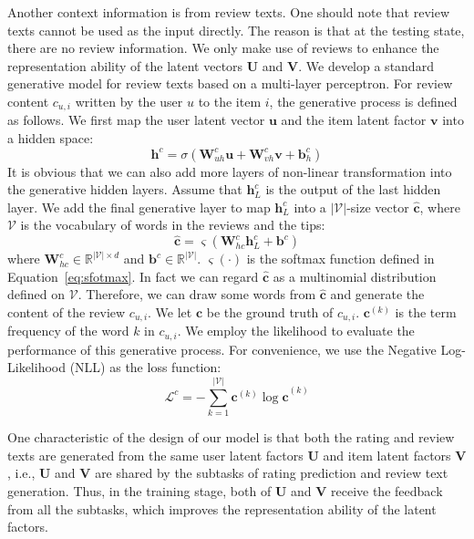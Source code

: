 \documentclass[sigconf]{acmart}
\begin{document}
Another context information is from review texts.
One should note that review texts cannot be used as the input directly.
The reason is that at the testing state, there are no review information.
We only make use of reviews to enhance the representation ability of the latent vectors $\mathbf{U}$ and  $\mathbf{V}$.
We develop a standard generative model for review texts based on a multi-layer perceptron. For review content $c_{u,i}$ written by the user $u$ to the item $i$, the generative process is defined as follows.
We first map the user latent vector $\mathbf{u}$ and the item latent factor  $\mathbf{v}$ into a hidden space:
\begin{equation}
{\mathbf{h}^c} = \sigma (\mathbf{W}_{uh}^c\mathbf{u} + \mathbf{W}_{vh}^c\mathbf{v} + \mathbf{b}_h^c)
\label{eq:hc}
\end{equation}
It is obvious that we can also add more layers of non-linear transformation into the generative hidden layers.
Assume that $\mathbf{h}^c_L$ is the output of the last hidden layer.
We add the final generative layer to map $\mathbf{h}^c_L$ into a $|\mathcal{V}|$-size vector $\mathbf{\hat c}$, where $\mathcal{V}$ is the vocabulary of words in the reviews and the tips:
\begin{equation}
{\mathbf{\hat c}} = \varsigma(\mathbf{W}_{hc}^c\mathbf{h}^c_{L} + \mathbf{b}^c)
\end{equation}
where $\mathbf{W}_{hc}^c \in \mathbb{R}^{|\mathcal{V}| \times d}$ and $\mathbf{b}^c \in \mathbb{R}^{|\mathcal{V}|}$. $\varsigma(\cdot)$ is the softmax function defined in Equation~\ref{eq:sfotmax}.
In fact we can regard $\mathbf{\hat c}$ as a multinomial distribution defined on $\mathcal{V}$. Therefore, we can draw some words from $\mathbf{\hat c}$ and generate the content of the review $c_{u,i}$.
We let $\mathbf{c}$ be the ground truth of $c_{u,i}$.
$\mathbf{c}^{(k)}$ is the term frequency of the word $k$ in $c_{u,i}$.
We employ the likelihood to evaluate the performance of this generative process.
For convenience, we use the Negative Log-Likelihood (NLL) as the loss function:
\begin{equation}
{\mathcal{L}^c} =  - \sum\limits_{k = 1}^{|\mathcal{V}|} {{\mathbf{c}^{(k)}}\log {\mathbf{\hat c}^{(k)}}}
\label{eq:lossc}
\end{equation}

One characteristic of the design of our model is that both the rating and review texts are generated from the same user latent factors $\mathbf{U}$ and item latent factors $\mathbf{V}$, i.e., $\mathbf{U}$ and $\mathbf{V}$ are shared by the subtasks of rating prediction and review text generation.
Thus, in the training stage, both of $\mathbf{U}$ and $\mathbf{V}$ receive the feedback from all the subtasks, which improves the representation ability of the latent factors.
\end{document}
